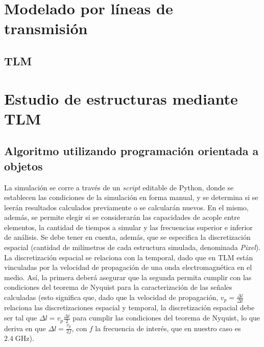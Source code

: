\section{Modelado por líneas de transmisión}


\subsection{TLM}
\label{subsubsec_tlm}



\section{Estudio de estructuras mediante TLM}
\label{sec_estudio_tlm}

		
\subsection{Algoritmo utilizando programación orientada a objetos}
\label{subsec_estudio_tlm}
La simulación se corre a través de un \textit{script} editable de Python, donde se establecen las condiciones de la simulación en forma manual, y se determina si se leerán resultados calculados previamente o se calcularán nuevos. En el mismo, además, se permite elegir si se considerarán  las capacidades de acople entre elementos, la cantidad de tiempos a simular y las frecuencias superior e inferior de análisis. Se debe tener en cuenta, además, que se especifica la discretización espacial (cantidad de milímetros de cada estructura simulada, denominada \textit{Pixel}). La discretización espacial se relaciona con la temporal, dado que en TLM están vinculadas por la velocidad de propagación de una onda electromagnética en el medio. Así, la primera deberá asegurar que la segunda permita cumplir con las condiciones del teorema de Nyquist para la caracterización de las señales calculadas (esto significa que, dado que la velocidad de propagación, $v_p=\frac{\Delta l}{\Delta t}$ relaciona las discretizaciones espacial y temporal, la discretización espacial debe ser tal que $\Delta l = v_p \frac{\Delta t}{2}$ para cumplir las condiciones del teorema de Nyquist, lo que deriva en que $\Delta l = \frac{v_p}{2f}$, con $f$ la frecuencia de interés, que en nuestro caso es $2.4\;\text{GHz}$).

